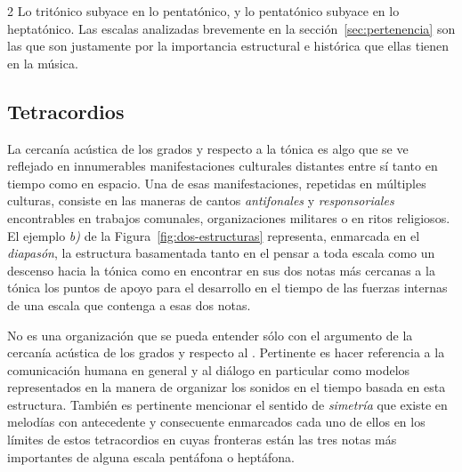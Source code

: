\documentclass[a4paper,11pt]{article}
\begin{document}
\begin{multicols}{2}
  Lo tritónico subyace en lo pentatónico, y lo pentatónico subyace en lo heptatónico. Las escalas analizadas brevemente en la sección~\ref{sec:pertenencia} son las que son justamente por la importancia estructural e histórica que ellas tienen en la música.

  \subsection{Tetracordios}\label{subsec:tetracordios}

  La cercanía acústica de los grados  y  respecto a la tónica  es algo que se ve reflejado en innumerables manifestaciones culturales distantes entre sí tanto en tiempo como en espacio. Una de esas manifestaciones, repetidas en múltiples culturas, consiste en las maneras de cantos \emph{antifonales} y \emph{responsoriales} encontrables en trabajos comunales, organizaciones militares o en ritos religiosos. El ejemplo \emph{b)} de la Figura~\ref{fig:dos-estructuras} representa, enmarcada en el \emph{diapasón}, la estructura basamentada tanto en el pensar a toda escala como un descenso hacia la tónica como en encontrar en sus dos notas más cercanas a la tónica los puntos de apoyo para el desarrollo en el tiempo de las fuerzas internas de una escala que contenga a esas dos notas.

  No es  una organización que se pueda entender sólo con el argumento de la cercanía acústica de los grados  y  respecto al . Pertinente es hacer referencia a la comunicación humana en general y al diálogo en particular como modelos representados en la manera de organizar los sonidos en el tiempo basada en esta estructura. También es pertinente mencionar el sentido de \emph{simetría} que existe en melodías con antecedente y consecuente enmarcados cada uno de ellos en los límites de estos tetracordios en cuyas fronteras están las tres notas más importantes de alguna escala pentáfona o heptáfona.


\end{multicols}
\end{document}
